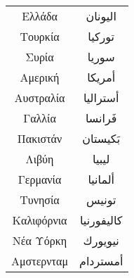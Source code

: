 \documentclass[twocolumn,a4paper]{article}
\newcommand{\ar}[1]{\textarabic{#1}}
\begin{document}
\clearpage


\begin{supertabular}{ c c }
Ελλάδα       & \ar{اليونان} \\
Τουρκία      & \ar{توركيا} \\
Συρία        & \ar{سوريا} \\
Αμερική      & \ar{أمريكا} \\
Αυστραλία    & \ar{أستراليا} \\
Γαλλία       & \ar{فَرانسا} \\
Πακιστάν     & \ar{بَكيستان} \\
Λιβύη        & \ar{ليبيا} \\
Γερμανία     & \ar{ألمانيا} \\
Τυνησία      & \ar{تونيس} \\
Καλιφόρνια   & \ar{كاليفورنيا} \\
Νέα Υόρκη    & \ar{نيويورك} \\
Αμστερνταμ   & \ar{أمستردام} \\
\end{supertabular}
\end{document}
